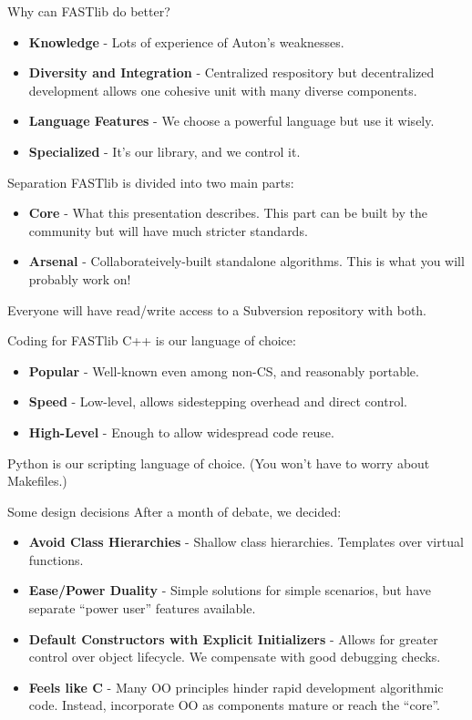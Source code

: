\documentclass[pdf,colorBG,slideColor]{prosper}
\newcommand{\itemt}[1]{\item {\bf #1} -}
\begin{document}
\begin{slide}{Why can FASTlib do better?}
 \begin{itemize}
  \itemt{Knowledge} Lots of experience of Auton's weaknesses.
  \itemt{Diversity and Integration}
  Centralized respository but decentralized development allows one cohesive unit with many diverse components.
  \itemt{Language Features}
  We choose a powerful language but use it wisely.
  \itemt{Specialized} It's our library, and we control it.
 \end{itemize}
\end{slide}

\begin{slide}{Separation}
 FASTlib is divided into two main parts:
 \begin{itemize}
 \itemt{Core} What this presentation describes.  This part can be built by
 the community but will have much stricter standards.
 \itemt{Arsenal} Collaborateively-built standalone algorithms.
 This is what you will probably work on!
 \end{itemize}
 Everyone will have read/write access to a Subversion repository with both.
\end{slide}

\begin{slide}{Coding for FASTlib}
 C++ is our language of choice:
 \begin{itemize}
 \itemt{Popular} Well-known even among non-CS, and reasonably portable.
 \itemt{Speed} Low-level, allows sidestepping overhead and direct control.
 \itemt{High-Level} Enough to allow widespread code reuse.
 \end{itemize}
 Python is our scripting language of choice.
 (You won't have to worry about Makefiles.)
\end{slide}

\begin{slide}{Some design decisions}
 After a month of debate, we decided:
 \begin{itemize}
  \itemt{Avoid Class Hierarchies}
  Shallow class hierarchies.  Templates over virtual functions.
  \itemt{Ease/Power Duality}
  Simple solutions for simple scenarios, but have separate ``power user'' features available.
  \itemt{Default Constructors with Explicit Initializers}
  Allows for greater control over object lifecycle.
  We compensate with good debugging checks.
  \itemt{Feels like C}
  Many OO principles hinder rapid development algorithmic code.
  Instead, incorporate OO as components mature or reach the ``core''.
 \end{itemize}
\end{slide}
\end{document}
